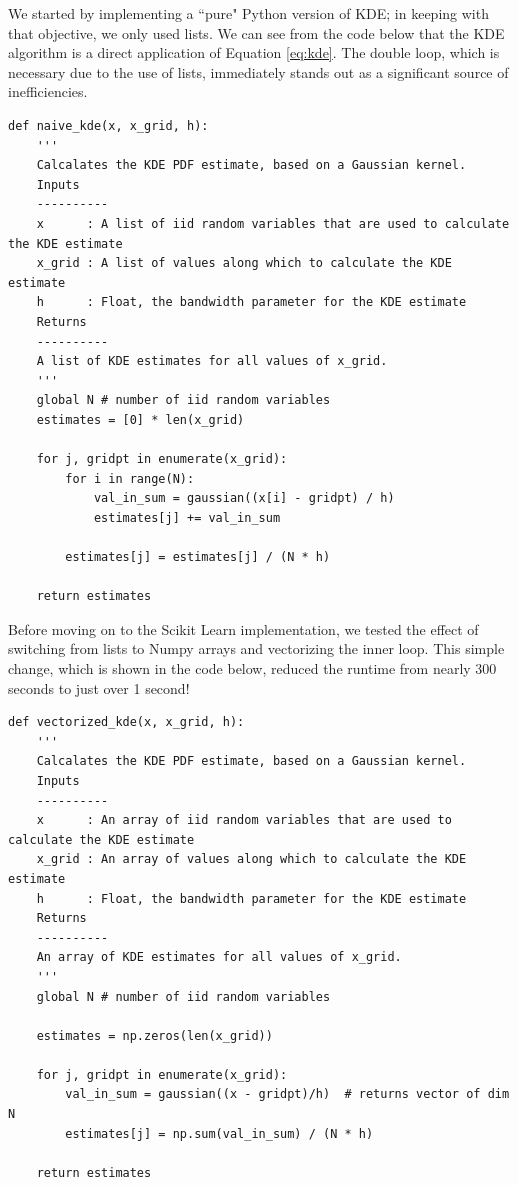 \documentclass[11pt]{article}
\begin{document}
\noindent We started by implementing a ``pure" Python version of KDE; in keeping with that objective, we only used lists. We can see from the code below that the KDE algorithm is a direct application of Equation \ref{eq:kde}. The double loop, which is necessary due to the use of lists, immediately stands out as a significant source of inefficiencies.

\begin{singlespacing}
\begin{scriptsize}
\begin{verbatim}
def naive_kde(x, x_grid, h):
    '''
    Calcalates the KDE PDF estimate, based on a Gaussian kernel.
    Inputs
    ----------
    x      : A list of iid random variables that are used to calculate the KDE estimate
    x_grid : A list of values along which to calculate the KDE estimate
    h      : Float, the bandwidth parameter for the KDE estimate
    Returns
    ----------
    A list of KDE estimates for all values of x_grid.
    '''
    global N # number of iid random variables
    estimates = [0] * len(x_grid)
    
    for j, gridpt in enumerate(x_grid):
        for i in range(N):
            val_in_sum = gaussian((x[i] - gridpt) / h)
            estimates[j] += val_in_sum
        
        estimates[j] = estimates[j] / (N * h)
    
    return estimates
\end{verbatim}
\end{scriptsize}
\end{singlespacing}

\newpage

\noindent Before moving on to the Scikit Learn implementation, we tested the effect of switching from lists to Numpy arrays and vectorizing the inner loop. This simple change, which is shown in the code below, reduced the runtime from nearly 300 seconds to just over 1 second!

\begin{singlespacing}
\begin{scriptsize}
\begin{verbatim}
def vectorized_kde(x, x_grid, h):
    '''
    Calcalates the KDE PDF estimate, based on a Gaussian kernel.
    Inputs
    ----------
    x      : An array of iid random variables that are used to calculate the KDE estimate
    x_grid : An array of values along which to calculate the KDE estimate
    h      : Float, the bandwidth parameter for the KDE estimate
    Returns
    ----------
    An array of KDE estimates for all values of x_grid.
    '''    
    global N # number of iid random variables

    estimates = np.zeros(len(x_grid))
    
    for j, gridpt in enumerate(x_grid):
        val_in_sum = gaussian((x - gridpt)/h)  # returns vector of dim N
        estimates[j] = np.sum(val_in_sum) / (N * h)
    
    return estimates
\end{verbatim}
\end{scriptsize}
\end{singlespacing}
\end{document}
